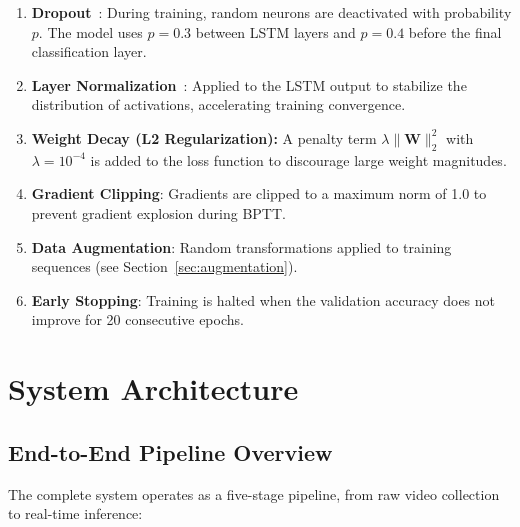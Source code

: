 \documentclass[12pt, a4paper]{article}
\begin{document}
\begin{enumerate}
    \item \textbf{Dropout}~\cite{srivastava2014dropout}: During training, random neurons are deactivated with probability $p$. The model uses $p = 0.3$ between LSTM layers and $p = 0.4$ before the final classification layer.

    \item \textbf{Layer Normalization}~\cite{ba2016layernorm}: Applied to the LSTM output to stabilize the distribution of activations, accelerating training convergence.

    \item \textbf{Weight Decay (L2 Regularization):} A penalty term $\lambda \|\mathbf{W}\|_2^2$ with $\lambda = 10^{-4}$ is added to the loss function to discourage large weight magnitudes.

    \item \textbf{Gradient Clipping}: Gradients are clipped to a maximum norm of 1.0 to prevent gradient explosion during BPTT.

    \item \textbf{Data Augmentation}: Random transformations applied to training sequences (see Section~\ref{sec:augmentation}).

    \item \textbf{Early Stopping}: Training is halted when the validation accuracy does not improve for 20 consecutive epochs.
\end{enumerate}


\section{System Architecture}
\label{sec:architecture}

\subsection{End-to-End Pipeline Overview}

The complete system operates as a five-stage pipeline, from raw video collection to real-time inference:
\end{document}
